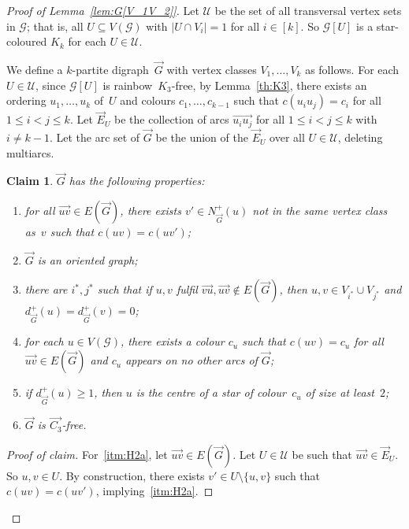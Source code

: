 \documentclass[a4paper, 12pt]{article}
\numberwithin{equation}{section}
\newtheorem{claim}[theorem]{Claim}
\newenvironment{proofclaim}[1][Proof of claim]{\begin{proof}[#1]\renewcommand*{\qedsymbol}{\(\blacksquare\)}}{\end{proof}}
\newcommand{\ova}[1]{\overrightarrow{#1}}
\newcommand{\mc}[1]{\mathcal{#1}}
\newcommand{\ms}[1]{\mathscr{#1}}
\begin{document}
\begin{proof}[Proof of Lemma~\ref{lem:G[V_1V_2]}]
Let $\mathcal{U}$ be the set of all transversal vertex sets in $\ms{G}$; that is, all $U \subseteq V(\ms G)$ with $|U \cap V_i| = 1$ for all $i \in [k]$.
So $\ms{G}[U]$ is a star-coloured $K_k$ for each $U \in \mc{U}$.


We define a $k$-partite digraph~$\ova{G}$ with vertex classes $V_1, \dots, V_k$ as follows. 
For each $U \in \mathcal{U}$, since $\ms{G}[U]$ is rainbow~$K_3$-free, by Lemma~\ref{th:K3}, there exists an ordering $u_1,\dots,u_k$ of~$U$ and colours $c_1, \dots, c_{k-1}$ such that $c(u_iu_j) = c_i$ for all $1 \le i < j \le k$.
Let $\ova{E}_U$ be the collection of arcs $\ova{u_iu_j}$ for all $1 \leq i < j \leq k$ with $i \neq k-1$.
Let the arc set of $\ova{G}$ be the union of the $\ova{E}_U$ over all $U \in \mc{U}$, deleting multiarcs.

\begin{claim}\label{cl:Hprops}
$\ova{G}$ has the following properties:
\begin{enumerate}[label = {\rm(\roman*)}]
	\item for all $\ova{uv} \in E(\ova{G})$, there exists $v' \in N^+_{\ova{G}}(u)$ not in the same vertex class as~$v$ such that $c(u v) = c(uv')$; \label{itm:H2a}
	\item $\ova{G}$ is an oriented graph; \label{itm:H3}
    \item there are $i^*, j^*$ such that if $u,v$ fulfil $\ova{vu},\ova{uv} \notin E(\ova{G})$, then $u,v\in V_{i^*}\cup V_{j^*}$
    and $d^+_{\ova{G}}(u) = d^+_{\ova{G}}(v)=0$; 
    \label{itm:H1}
	\item for each $u \in V(\ms{G})$, there exists a colour $c_u$ such that $c(uv) = c_u$ for all $\ova{uv} \in E(\ova{G})$ and $c_u$ appears on no other arcs of $\ova{G}$; \label{itm:H5}
	\item if $d^+_{\ova{G}}(u) \ge 1$, then $u$ is the centre of a star of colour~$c_u$ of size at least~$2$;\label{itm:H6}
	\item $\ova{G}$ is $\ova{C_3}$-free. \label{itm:H7}
\end{enumerate}
\end{claim}

\begin{proofclaim}
For~\ref{itm:H2a}, let $\ova{uv} \in E(\ova{G})$.
Let $U \in \mc{U}$ be such that $\ova{uv} \in \ova{E}_U$.
So $u,v \in U$. 
By construction, there exists $v' \in U \setminus \{u,v\}$ such that $c(u v) = c(uv')$, implying~\ref{itm:H2a}.


\end{proofclaim}
\end{proof}
\end{document}
